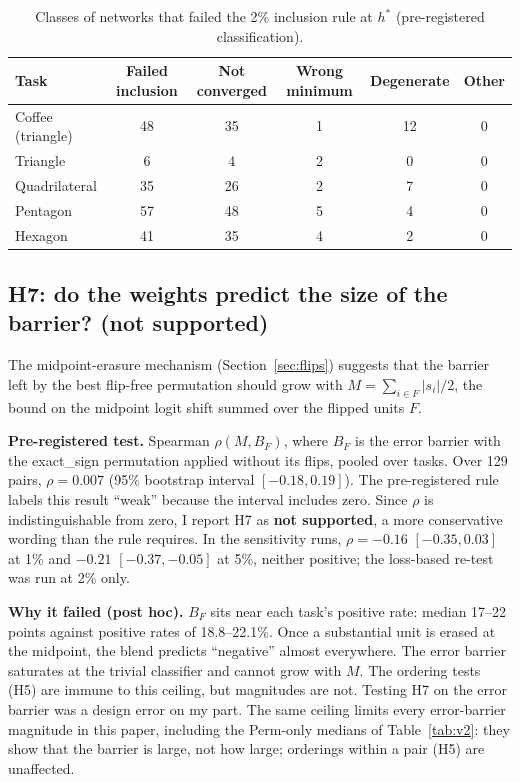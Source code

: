 \documentclass[11pt]{article}
\newcommand{\md}[1]{\textsf{#1}}
\begin{document}
\begin{table}[t]
\centering\small
\caption{Classes of networks that failed the 2\% inclusion rule at $h^*$ (pre-registered classification).}
\label{tab:v2excl}
\begin{tabular}{@{}lccccc@{}}
\toprule
Task & Failed inclusion & Not converged & Wrong minimum & Degenerate & Other \\
\midrule
Coffee (triangle) & 48 & 35 & 1 & 12 & 0 \\
Triangle & 6 & 4 & 2 & 0 & 0 \\
Quadrilateral & 35 & 26 & 2 & 7 & 0 \\
Pentagon & 57 & 48 & 5 & 4 & 0 \\
Hexagon & 41 & 35 & 4 & 2 & 0 \\
\bottomrule
\end{tabular}
\end{table}

\subsection{H7: do the weights predict the size of the barrier? (not supported)}
\label{sec:v2h7}

The midpoint-erasure mechanism (Section~\ref{sec:flips}) suggests that the barrier left by the best flip-free permutation should grow with $M = \sum_{i \in F} |s_i|/2$, the bound on the midpoint logit shift summed over the flipped units $F$.

\textbf{Pre-registered test.} Spearman $\rho(M, B_F)$, where $B_F$ is the error barrier with the \md{exact\_sign} permutation applied without its flips, pooled over tasks. Over 129 pairs, $\rho = 0.007$ (95\% bootstrap interval $[-0.18, 0.19]$). The pre-registered rule labels this result ``weak'' because the interval includes zero. Since $\rho$ is indistinguishable from zero, I report H7 as \textbf{not supported}, a more conservative wording than the rule requires. In the sensitivity runs, $\rho = -0.16$ $[-0.35, 0.03]$ at 1\% and $-0.21$ $[-0.37, -0.05]$ at 5\%, neither positive; the loss-based re-test was run at 2\% only.

\textbf{Why it failed (post hoc).} $B_F$ sits near each task's positive rate: median 17--22 points against positive rates of 18.8--22.1\%. Once a substantial unit is erased at the midpoint, the blend predicts ``negative'' almost everywhere. The error barrier saturates at the trivial classifier and cannot grow with $M$. The ordering tests (H5) are immune to this ceiling, but magnitudes are not. Testing H7 on the error barrier was a design error on my part. The same ceiling limits every error-barrier magnitude in this paper, including the Perm-only medians of Table~\ref{tab:v2}: they show that the barrier is large, not how large; orderings within a pair (H5) are unaffected.
\end{document}
